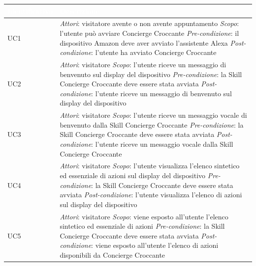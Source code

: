 \begin{center}
	\centering
	\renewcommand{\arraystretch}{1.5}
	\begin{longtable}{  p{2.5cm} p{9.8cm} }
		\rowcolor{tableHead}
		\textbf{\textcolor{white}{Identificativo}} & \textbf{\textcolor{white}{Descrizione}} \\
		\endhead  
		
		UC1 &  \textit{Attori}: visitatore avente o non avente appuntamento \newline \textit{Scopo}: l'utente può avviare Concierge Croccante \newline \textit{Pre-condizione}: il dispositivo Amazon deve aver avviato \mbox{l'assistente} Alexa \newline \textit{Post-condizione}: l'utente ha avviato Concierge Croccante \\
		
		UC2 &  \textit{Attori}: visitatore  \newline \textit{Scopo}: l'utente riceve un messaggio di benvenuto sul display del dispositivo \newline \textit{Pre-condizione}: la Skill Concierge Croccante deve essere stata avviata \newline \textit{Post-condizione}: l'utente riceve un messaggio di benvenuto sul display del dispositivo \\
		
		UC3 &  \textit{Attori}: visitatore  \newline \textit{Scopo}: l'utente riceve un messaggio vocale di benvenuto dalla Skill \mbox{Concierge} Croccante \newline \textit{Pre-condizione}: la Skill Concierge Croccante deve essere stata avviata \newline \textit{Post-condizione}: l'utente riceve un messaggio vocale dalla Skill Concierge Croccante\\
		
		UC4 &  \textit{Attori}: visitatore  \newline \textit{Scopo}: l'utente visualizza l'elenco sintetico ed essenziale di azioni sul \mbox{display} del dispositivo \newline \textit{Pre-condizione}: la Skill Concierge Croccante deve essere stata avviata \newline \textit{Post-condizione}: l'utente visualizza l'elenco di azioni sul display del dispositivo \\
		
		UC5 &  \textit{Attori}: visitatore  \newline \textit{Scopo}: viene esposto all'utente l'elenco sintetico ed essenziale di azioni \newline \textit{Pre-condizione}: la Skill Concierge Croccante deve essere stata avviata \newline \textit{Post-condizione}: viene esposto all'utente l'elenco di azioni disponibili da Concierge Croccante \\
		

\end{longtable}
\end{center}
